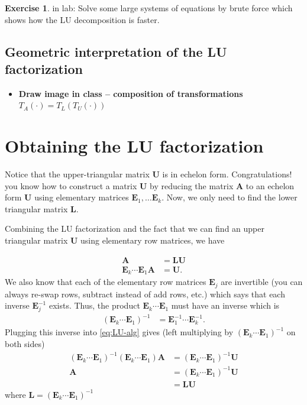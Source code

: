 \documentclass[
]{book}
\providecommand{\tightlist}{%
  \setlength{\itemsep}{0pt}\setlength{\parskip}{0pt}}
\theoremstyle{definition}
\theoremstyle{definition}
\theoremstyle{definition}
\newtheorem{exercise}{Exercise}[chapter]
\theoremstyle{remark}
\begin{document}
\begin{exercise}
\protect\hypertarget{exr:unnamed-chunk-161}{}{\label{exr:unnamed-chunk-161} }in lab:
Solve some large systems of equations by brute force which shows how the LU decomposition is faster.
\end{exercise}

\hypertarget{geometric-interpretation-of-the-lu-factorization}{%
\subsection{Geometric interpretation of the LU factorization}\label{geometric-interpretation-of-the-lu-factorization}}

\begin{itemize}
\tightlist
\item
  \textbf{Draw image in class -- composition of transformations \(T_A(\cdot) = T_L(T_U(\cdot))\)}
\end{itemize}

\hypertarget{obtaining-the-lu-factorization}{%
\section{Obtaining the LU factorization}\label{obtaining-the-lu-factorization}}

Notice that the upper-triangular matrix \(\mathbf{U}\) is in echelon form. Congratulations! you know how to construct a matrix \(\mathbf{U}\) by reducing the matrix \(\mathbf{A}\) to an echelon form \(\mathbf{U}\) using elementary matrices \(\mathbf{E}_1, \ldots \mathbf{E}_k\). Now, we only need to find the lower triangular matrix \(\mathbf{L}\).

Combining the LU factorization and the fact that we can find an upper triangular matrix \(\mathbf{U}\) using elementary row matrices, we have

\[
\begin{aligned}
\mathbf{A} & = \mathbf{L} \mathbf{U} \\
\mathbf{E}_k \cdots \mathbf{E}_1 \mathbf{A} & = \mathbf{U}.
\end{aligned}
\label{eq:LU-alg}
\]
We also know that each of the elementary row matrices \(\mathbf{E}_j\) are invertible (you can always re-swap rows, subtract instead of add rows, etc.) which says that each inverse \(\mathbf{E}_j^{-1}\) exists. Thus, the product \(\mathbf{E}_k \cdots \mathbf{E}_1\) must have an inverse which is
\[
\begin{aligned}
(\mathbf{E}_k \cdots \mathbf{E}_1)^{-1} & = \mathbf{E}_1^{-1} \cdots \mathbf{E}_k^{-1}.
\end{aligned}
\]
Plugging this inverse into \eqref{eq:LU-alg} gives (left multiplying by \((\mathbf{E}_k \cdots \mathbf{E}_1)^{-1}\) on both sides)
\[
\begin{aligned}
(\mathbf{E}_k \cdots \mathbf{E}_1)^{-1} (\mathbf{E}_k \cdots \mathbf{E}_1) \mathbf{A} & = (\mathbf{E}_k \cdots \mathbf{E}_1)^{-1}\mathbf{U} \\
 \mathbf{A} & = (\mathbf{E}_k \cdots \mathbf{E}_1)^{-1}\mathbf{U} \\
 & = \mathbf{L} \mathbf{U}
\end{aligned}
\]
where \(\mathbf{L} = (\mathbf{E}_k \cdots \mathbf{E}_1)^{-1}\)
\end{document}
